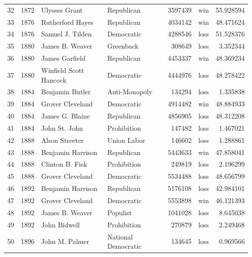 \documentclass[
  letterpaper,
  DIV=11,
  numbers=noendperiod]{scrreprt}
\begin{document}
\begin{tabular}{lrllrlr}
32  &  1872 &           Ulysses Grant &             Republican &       3597439 &    win &  55.928594 \\
33  &  1876 &        Rutherford Hayes &             Republican &       4034142 &    win &  48.471624 \\
34  &  1876 &        Samuel J. Tilden &             Democratic &       4288546 &   loss &  51.528376 \\
35  &  1880 &         James B. Weaver &              Greenback &        308649 &   loss &   3.352344 \\
36  &  1880 &          James Garfield &             Republican &       4453337 &    win &  48.369234 \\
37  &  1880 &  Winfield Scott Hancock &             Democratic &       4444976 &   loss &  48.278422 \\
38  &  1884 &         Benjamin Butler &          Anti-Monopoly &        134294 &   loss &   1.335838 \\
39  &  1884 &        Grover Cleveland &             Democratic &       4914482 &    win &  48.884933 \\
40  &  1884 &         James G. Blaine &             Republican &       4856905 &   loss &  48.312208 \\
41  &  1884 &           John St. John &            Prohibition &        147482 &   loss &   1.467021 \\
42  &  1888 &          Alson Streeter &            Union Labor &        146602 &   loss &   1.288861 \\
43  &  1888 &       Benjamin Harrison &             Republican &       5443633 &    win &  47.858041 \\
44  &  1888 &         Clinton B. Fisk &            Prohibition &        249819 &   loss &   2.196299 \\
45  &  1888 &        Grover Cleveland &             Democratic &       5534488 &   loss &  48.656799 \\
46  &  1892 &       Benjamin Harrison &             Republican &       5176108 &   loss &  42.984101 \\
47  &  1892 &        Grover Cleveland &             Democratic &       5553898 &    win &  46.121393 \\
48  &  1892 &         James B. Weaver &               Populist &       1041028 &   loss &   8.645038 \\
49  &  1892 &            John Bidwell &            Prohibition &        270879 &   loss &   2.249468 \\
50  &  1896 &          John M. Palmer &    National Democratic &        134645 &   loss &   0.969566 \\

\end{tabular}
\end{document}
